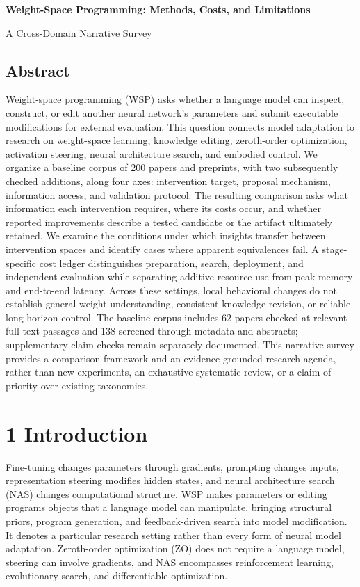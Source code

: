 \begin{center}{\LARGE\bfseries Weight-Space Programming: Methods, Costs, and Limitations}\end{center}

A Cross-Domain Narrative Survey


\subsection*{Abstract}

Weight-space programming (WSP) asks whether a language model can inspect, construct, or edit another neural network's parameters and submit executable modifications for external evaluation. This question connects model adaptation to research on weight-space learning, knowledge editing, zeroth-order optimization, activation steering, neural architecture search, and embodied control. We organize a baseline corpus of 200 papers and preprints, with two subsequently checked additions, along four axes: intervention target, proposal mechanism, information access, and validation protocol. The resulting comparison asks what information each intervention requires, where its costs occur, and whether reported improvements describe a tested candidate or the artifact ultimately retained. We examine the conditions under which insights transfer between intervention spaces and identify cases where apparent equivalences fail. A stage-specific cost ledger distinguishes preparation, search, deployment, and independent evaluation while separating additive resource use from peak memory and end-to-end latency. Across these settings, local behavioral changes do not establish general weight understanding, consistent knowledge revision, or reliable long-horizon control. The baseline corpus includes 62 papers checked at relevant full-text passages and 138 screened through metadata and abstracts; supplementary claim checks remain separately documented. This narrative survey provides a comparison framework and an evidence-grounded research agenda, rather than new experiments, an exhaustive systematic review, or a claim of priority over existing taxonomies.


\section*{1 Introduction}

Fine-tuning changes parameters through gradients, prompting changes inputs, representation steering modifies hidden states, and neural architecture search (NAS) changes computational structure. WSP makes parameters or editing programs objects that a language model can manipulate, bringing structural priors, program generation, and feedback-driven search into model modification.\cite{r1,r2,r4,r6,r10,r11} It denotes a particular research setting rather than every form of neural model adaptation. Zeroth-order optimization (ZO) does not require a language model, steering can involve gradients, and NAS encompasses reinforcement learning, evolutionary search, and differentiable optimization.\cite{r51,r86,r131}



